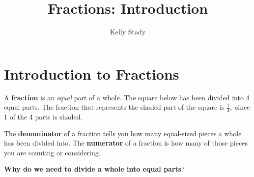 \documentclass[handout, font=12pt]{ximera}
\title{Fractions: Introduction}   %
\author{Kelly Stady}
\begin{document}
   

\begin{abstract}

\end{abstract}

\maketitle

\label{xim:FractionsIntro}

\section*{Introduction to Fractions}

A \textbf{fraction} is an \emph{equal} part of a whole. The square below has been divided into 4 equal parts.  The fraction 
that represents the shaded part of the square is $\textstyle \frac{1}{4},$ since 1 of the 4 parts is shaded.

\begin{center}


\end{center}

The \textbf{denominator} of a fraction tells you how many equal-sized pieces a whole has been divided into.  The \textbf{numerator} 
of a fraction is how many of those pieces you are counting or considering.


\textbf{Why do we need to divide a whole into equal parts}?
\end{document}
